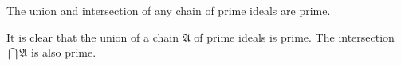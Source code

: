 The union and intersection of any chain of prime ideals are prime.

It is clear that the union of a chain $\mathfrak{A}$ of prime ideals is prime. The intersection $\bigcap \mathfrak{A}$ is also prime.
